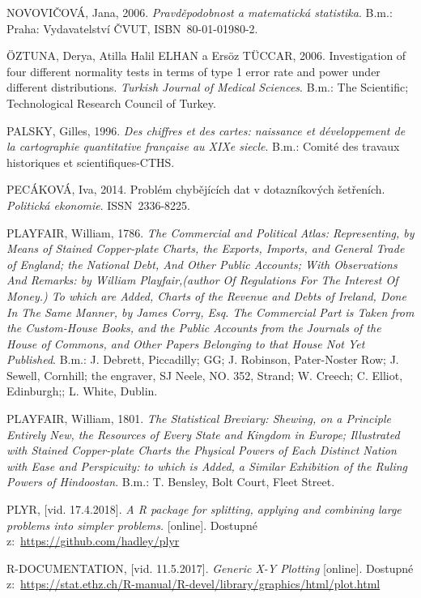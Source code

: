 \documentclass[12pt,]{article}
\begin{document}
\hypertarget{ref-novovic2006}{}
NOVOVIČOVÁ, Jana, 2006. \emph{Pravděpodobnost a matematická statistika}.
B.m.: Praha: Vydavatelství ČVUT, ISBN~80-01-01980-2.

\hypertarget{ref-normality_tests}{}
ÖZTUNA, Derya, Atilla Halil ELHAN a Ersöz TÜCCAR, 2006. Investigation of
four different normality tests in terms of type 1 error rate and power
under different distributions. \emph{Turkish Journal of Medical
Sciences}. B.m.: The Scientific; Technological Research Council of
Turkey.

\hypertarget{ref-palsky1996}{}
PALSKY, Gilles, 1996. \emph{Des chiffres et des cartes: naissance et
développement de la cartographie quantitative française au XIXe siecle}.
B.m.: Comité des travaux historiques et scientifiques-CTHS.

\hypertarget{ref-pecakova}{}
PECÁKOVÁ, Iva, 2014. Problém chybějících dat v dotazníkových šetřeních.
\emph{Politická ekonomie}. ISSN~2336-8225.

\hypertarget{ref-playfair1786}{}
PLAYFAIR, William, 1786. \emph{The Commercial and Political Atlas:
Representing, by Means of Stained Copper-plate Charts, the Exports,
Imports, and General Trade of England; the National Debt, And Other
Public Accounts; With Observations And Remarks: by William
Playfair,(author Of Regulations For The Interest Of Money.) To which are
Added, Charts of the Revenue and Debts of Ireland, Done In The Same
Manner, by James Corry, Esq. The Commercial Part is Taken from the
Custom-House Books, and the Public Accounts from the Journals of the
House of Commons, and Other Papers Belonging to that House Not Yet
Published}. B.m.: J. Debrett, Piccadilly; GG; J. Robinson, Pater-Noster
Row; J. Sewell, Cornhill; the engraver, SJ Neele, NO. 352, Strand; W.
Creech; C. Elliot, Edinburgh;; L. White, Dublin.

\hypertarget{ref-playfair1801}{}
PLAYFAIR, William, 1801. \emph{The Statistical Breviary: Shewing, on a
Principle Entirely New, the Resources of Every State and Kingdom in
Europe; Illustrated with Stained Copper-plate Charts the Physical Powers
of Each Distinct Nation with Ease and Perspicuity: to which is Added, a
Similar Exhibition of the Ruling Powers of Hindoostan}. B.m.: T.
Bensley, Bolt Court, Fleet Street.

\hypertarget{ref-plyr}{}
PLYR, {[}vid. 17.4.2018{]}. \emph{A R package for splitting, applying
and combining large problems into simpler problems.} {[}online{]}.
Dostupné z:~\url{https://github.com/hadley/plyr}

\hypertarget{ref-plot}{}
R-DOCUMENTATION, {[}vid. 11.5.2017{]}. \emph{Generic X-Y Plotting}
{[}online{]}. Dostupné
z:~\url{https://stat.ethz.ch/R-manual/R-devel/library/graphics/html/plot.html}
\end{document}
